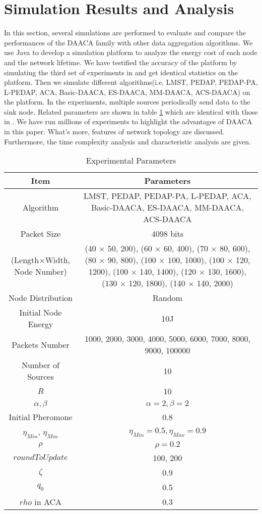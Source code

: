 \documentclass{elsarticle}
\begin{document}
\section{Simulation Results and Analysis} \label{simulationResultsandAnalysis}
In this section, several simulations are performed to evaluate and compare the performances of the DAACA family with other data aggregation algorithms. We use Java to develop a simulation platform to analyze the energy cost of each node and the network lifetime. We have testified the accuracy of the platform by simulating the third set of experiments in \cite{label-10} and get identical statistics on the platform. Then we simulate different algorithms(i.e. LMST, PEDAP, PEDAP-PA, L-PEDAP, ACA, Basic-DAACA, ES-DAACA, MM-DAACA, ACS-DAACA) on the platform. In the experiments, multiple sources periodically send data to the sink node. Related parameters are shown in table \ref{table3} which are identical with those in \cite{label-10}. We have run millions of experiments to highlight the advantages of DAACA in this paper. What's more, features of network topology are discussed. Furthermore, the time complexity analysis and characteristic analysis are given.

\begin{table}
\centering
\caption{Experimental Parameters} \label{table3}
\begin{tabular}{c|c}
\hline
\textbf{Item} & \textbf{Parameters} \\
\hline
Algorithm & \multicolumn{1}{p{6cm}}{LMST, PEDAP, PEDAP-PA, L-PEDAP, ACA, Basic-DAACA, ES-DAACA, MM-DAACA, ACS-DAACA} \\
Packet Size & 4098 bits \\
(Length$\times$Width, Node Number) & \multicolumn{1}{p{6cm}}{(40 $\times$ 50, 200), (60 $\times$ 60, 400), (70 $\times$ 80, 600), (80 $\times$ 90, 800), (100 $\times$ 100, 1000), (100 $\times$ 120, 1200), (100 $\times$ 140, 1400), (120 $\times$ 130, 1600), (130 $\times$ 120, 1800), (140 $\times$ 140, 2000)} \\
Node Distribution & Random \\
Initial Node Energy & 10J \\
Packets Number & \multicolumn{1}{p{6cm}}{1000, 2000, 3000, 4000, 5000, 6000, 7000, 8000, 9000, 100000} \\
Number of Sources & 10 \\
$R$ & 10 \\
$\alpha, \beta$ & $\alpha=2, \beta=2$ \\
Initial Pheromone & 0.8 \\
$\eta_{Min}$, $\eta_{Min}$ & $\eta_{Min}=0.5, \eta_{Max}=0.9$ \\
$\rho$ & $\rho=0.2$ \\
$roundToUpdate$ & 100, 200 \\
$\zeta$ & 0.9 \\
$q_0$ & 0.5 \\
$rho$ in ACA & 0.3\\
\hline
\end{tabular}

\end{table}
\end{document}
